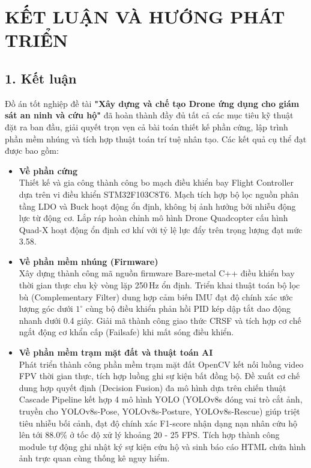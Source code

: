 \section*{KẾT LUẬN VÀ HƯỚNG PHÁT TRIỂN}

\subsection*{1. Kết luận}

Đồ án tốt nghiệp đề tài \textbf{"Xây dựng và chế tạo Drone ứng dụng cho giám sát an ninh và cứu hộ"} đã hoàn thành đầy đủ tất cả các mục tiêu kỹ thuật đặt ra ban đầu, giải quyết trọn vẹn cả bài toán thiết kế phần cứng, lập trình phần mềm nhúng và tích hợp thuật toán trí tuệ nhân tạo. Các kết quả cụ thể đạt được bao gồm:

\begin{itemize}
    \item \textbf{Về phần cứng}\\
    Thiết kế và gia công thành công bo mạch điều khiển bay Flight Controller dựa trên vi điều khiển STM32F103C8T6. Mạch tích hợp bộ lọc nguồn phân tầng LDO và Buck hoạt động ổn định, không bị ảnh hưởng bởi nhiễu động lực từ động cơ. Lắp ráp hoàn chỉnh mô hình Drone Quadcopter cấu hình Quad-X hoạt động ổn định cơ khí với tỷ lệ lực đẩy trên trọng lượng đạt mức 3.58.

    \item \textbf{Về phần mềm nhúng (Firmware)}\\
    Xây dựng thành công mã nguồn firmware Bare-metal C++ điều khiển bay thời gian thực chu kỳ vòng lặp 250\,Hz ổn định. Triển khai thuật toán bộ lọc bù (Complementary Filter) dung hợp cảm biến IMU đạt độ chính xác ước lượng góc dưới $1^\circ$ cùng bộ điều khiển phản hồi PID kép dập tắt dao động nhanh dưới 0.4 giây. Giải mã thành công giao thức CRSF và tích hợp cơ chế ngắt động cơ khẩn cấp (Failsafe) khi mất sóng điều khiển.

    \item \textbf{Về phần mềm trạm mặt đất và thuật toán AI}\\
    Phát triển thành công phần mềm trạm mặt đất OpenCV kết nối luồng video FPV thời gian thực, tích hợp luồng ghi sự kiện bất đồng bộ. Đề xuất cơ chế dung hợp quyết định (Decision Fusion) đa mô hình dựa trên chiến thuật Cascade Pipeline kết hợp 4 mô hình YOLO (YOLOv8s đóng vai trò cắt ảnh, truyền cho YOLOv8s-Pose, YOLOv8s-Posture, YOLOv8s-Rescue) giúp triệt tiêu nhiễu bối cảnh, đạt độ chính xác F1-score nhận dạng nạn nhân cứu hộ lên tới 88.0\% ở tốc độ xử lý khoảng 20 - 25 FPS. Tích hợp thành công module tự động ghi nhật ký sự kiện cứu hộ và sinh báo cáo HTML chứa hình ảnh trực quan cùng thống kê nguy hiểm.
\end{itemize}

